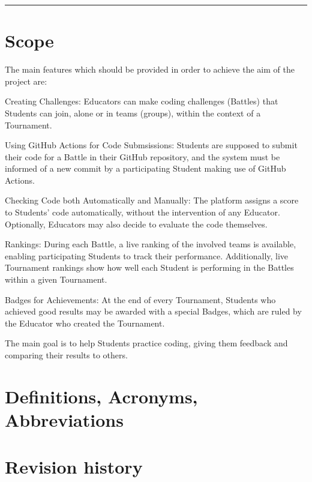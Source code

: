 \documentclass{Configuration_Files/PoliMi3i_thesis}
\begin{document}
{\color{bluepoli}\rule{\linewidth}{0.1pt}}

\section{Scope}

The main features which should be provided in order to achieve the aim of the project are:

\item \textcolor{bluepoli}{Creating Challenges:} Educators can make coding challenges (Battles) that Students can join, alone or in teams (groups), within the context of a Tournament.

\item \textcolor{bluepoli}{Using GitHub Actions for Code Submsissions:} Students are supposed to submit their code for a Battle in their GitHub repository, and the system must be informed of a new commit by a participating Student making use of GitHub Actions.

\item \textcolor{bluepoli}{Checking Code both Automatically and Manually:} The platform assigns a score to Students' code automatically, without the intervention of any Educator. Optionally, Educators may also decide to evaluate the code themselves.

\item \textcolor{bluepoli}{Rankings:} During each Battle, a live ranking of the involved teams is available, enabling participating Students to track their performance. Additionally, live Tournament rankings show how well each Student is performing in the Battles within a given Tournament.

\item \textcolor{bluepoli}{Badges for Achievements:} At the end of every Tournament, Students who achieved good results may be awarded with a special Badges, which are ruled by the Educator who created the Tournament.

The main goal is to help Students practice coding, giving them feedback and comparing their results to others.


\section{Definitions, Acronyms, Abbreviations}

\section{Revision history}
\end{document}
